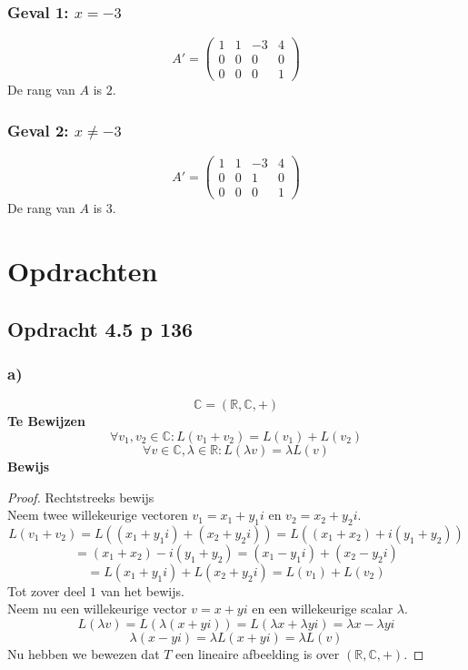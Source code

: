 \documentclass[lineaire_algebra_oplossingen.tex]{subfiles}
\begin{document}
\subsubsection*{Geval 1: $x=-3$}
\[
A'= 
\begin{pmatrix}
1 & 1 & -3 & 4\\
0 & 0 & 0 & 0\\
0 & 0 & 0 & 1
\end{pmatrix}
\]
De rang van $A$ is $2$.

\subsubsection*{Geval 2: $x\neq-3$}
\[
A'= 
\begin{pmatrix}
1 & 1 & -3 & 4\\
0 & 0 & 1 & 0\\
0 & 0 & 0 & 1
\end{pmatrix}
\]
De rang van $A$ is $3$.

\section{Opdrachten}

\subsection{Opdracht 4.5 p 136}
\label{4.5}
\subsubsection*{a)}
\[
\mathbb{C} = (\mathbb{R},\mathbb{C},+)
\]
\textbf{Te Bewijzen}\\
\[
\forall v_1,v_2 \in \mathbb{C}: L(v_1+v_2) = L(v_1)+L(v_2) 
\]
\[
\forall v\in \mathbb{C}, \lambda \in \mathbb{R}: L(\lambda v) = \lambda L(v)
\]
\textbf{Bewijs}\\
\begin{proof}
Rechtstreeks bewijs\\
Neem twee willekeurige vectoren $v_1 = x_1+y_1i$ en $v_2=x_2+y_2i$.
\[
L(v_1+v_2)=L( (x_1+y_1i) + (x_2+y_2i)) = L((x_1+x_2) + i(y_1+y_2))
\]
\[
= (x_1+x_2)-i(y_1+y_2) = (x_1-y_1i) + (x_2-y_2i)
\]
\[
= L(x_1+y_1i) + L(x_2+y_2i) = L(v_1)+L(v_2)
\]
Tot zover deel $1$ van het bewijs.\\
Neem nu een willekeurige vector $v=x+yi$ en een willekeurige scalar $\lambda$.
\[
L(\lambda v) = L(\lambda (x+yi)) = L(\lambda x + \lambda yi) = \lambda x - \lambda yi
\]
\[
\lambda (x-yi) = \lambda L(x+yi) = \lambda L(v)
\]
Nu hebben we bewezen dat $T$ een lineaire afbeelding is over $(\mathbb{R},\mathbb{C},+)$.
\end{proof}
\end{document}
